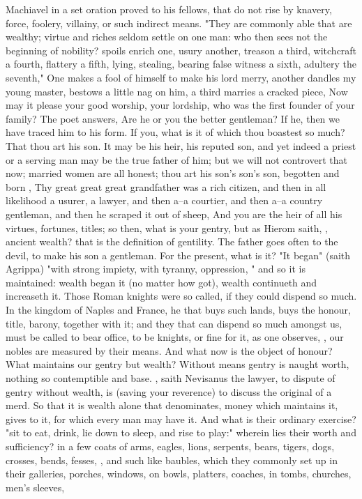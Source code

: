 {Machiavel in a set oration proved to his fellows, that do not rise by knavery, force, foolery, villainy, or such indirect means. "They are commonly able that are wealthy; virtue and riches seldom settle on one man: who then sees not the beginning of nobility? spoils enrich one, usury another, treason a third, witchcraft a fourth, flattery a fifth, lying, stealing, bearing false witness a sixth, adultery the seventh," \etc{} One makes a fool of himself to make his lord merry, another dandles my young master, bestows a little nag on him, a third marries a cracked piece, \etc{} Now may it please your good worship, your lordship, who was the first founder of your family? The poet answers,  Are he or you the better gentleman? If he, then we have traced him to his form. If you, what is it of which thou boastest so much? That thou art his son. It may be his heir, his reputed son, and yet indeed a priest or a serving man may be the true father of him; but we will not controvert that now; married women are all honest; thou art his son's son's son, begotten and born , \etc{} Thy great great great grandfather was a rich citizen, and then in all likelihood a usurer, a lawyer, and then a--a courtier, and then a--a country gentleman, and then he scraped it out of sheep, \etc{} And you are the heir of all his virtues, fortunes, titles; so then, what is your gentry, but as Hierom saith, , ancient wealth? that is the definition of gentility. The father goes often to the devil, to make his son a gentleman. For the present, what is it? "It began" (saith Agrippa) "with strong impiety, with tyranny, oppression, \etc{}" and so it is maintained: wealth began it (no matter how got), wealth continueth and increaseth it. Those Roman knights were so called, if they could dispend  so much. In the kingdom of Naples and France, he that buys such lands, buys the honour, title, barony, together with it; and they that can dispend so much amongst us, must be called to bear office, to be knights, or fine for it, as one observes, , our nobles are measured by their means. And what now is the object of honour? What maintains our gentry but wealth?  Without means gentry is naught worth, nothing so contemptible and base. , saith Nevisanus the lawyer, to dispute of gentry without wealth, is (saving your reverence) to discuss the original of a merd. So that it is wealth alone that denominates, money which maintains it, gives  to it, for which every man may have it. And what is their ordinary exercise? "sit to eat, drink, lie down to sleep, and rise to play:" wherein lies their worth and sufficiency? in a few coats of arms, eagles, lions, serpents, bears, tigers, dogs, crosses, bends, fesses, \etc{}, and such like baubles, which they commonly set up in their galleries, porches, windows, on bowls, platters, coaches, in tombs, churches, men's sleeves, }
